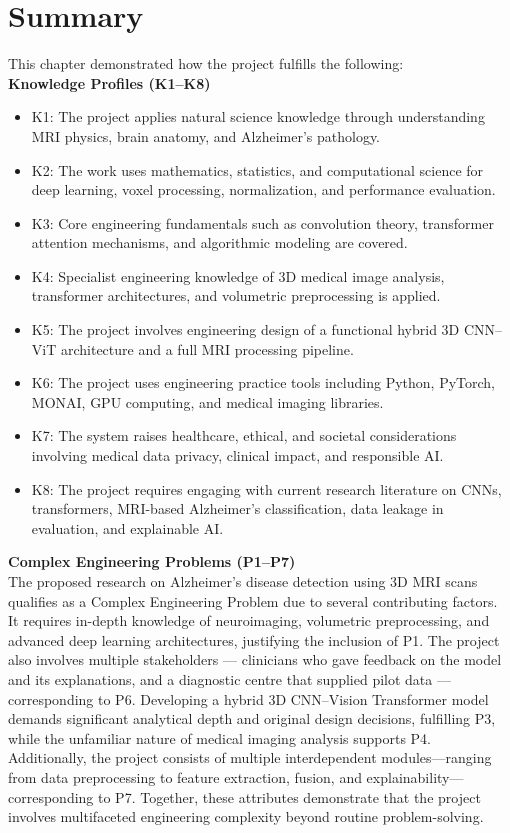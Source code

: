 \section{Summary}
This chapter demonstrated how the project fulfills the following:\\
\textbf{Knowledge Profiles (K1–K8)}\\
\begin{itemize}
    \item K1: The project applies natural science knowledge through understanding MRI physics, brain anatomy, and       Alzheimer’s pathology.
    \item K2: The work uses mathematics, statistics, and computational science for deep learning, voxel              processing, normalization, and performance evaluation.
    \item K3: Core engineering fundamentals such as convolution theory, transformer attention mechanisms, and               algorithmic modeling are covered.
    \item K4: Specialist engineering knowledge of 3D medical image analysis, transformer architectures, and volumetric preprocessing is applied.
    \item K5: The project involves engineering design of a functional hybrid 3D CNN–ViT architecture and a full MRI processing pipeline.
    \item K6: The project uses engineering practice tools including Python, PyTorch, MONAI, GPU computing, and medical imaging libraries.
    \item K7: The system raises healthcare, ethical, and societal considerations involving medical data privacy,     clinical impact, and responsible AI.
    \item K8: The project requires engaging with current research literature on CNNs, transformers, MRI-based Alzheimer's classification, data leakage in evaluation, and explainable AI.
\end{itemize}
\textbf{Complex Engineering Problems (P1–P7)}\\
The proposed research on Alzheimer’s disease detection using 3D MRI scans qualifies as a Complex Engineering Problem due to several contributing factors. It requires in-depth knowledge of neuroimaging, volumetric preprocessing, and advanced deep learning architectures, justifying the inclusion of P1. The project also involves multiple stakeholders --- clinicians who gave feedback on the model and its explanations, and a diagnostic centre that supplied pilot data --- corresponding to P6. Developing a hybrid 3D CNN–Vision Transformer model demands significant analytical depth and original design decisions, fulfilling P3, while the unfamiliar nature of medical imaging analysis supports P4. Additionally, the project consists of multiple interdependent modules—ranging from data preprocessing to feature extraction, fusion, and explainability—corresponding to P7. Together, these attributes demonstrate that the project involves multifaceted engineering complexity beyond routine problem-solving.\\
